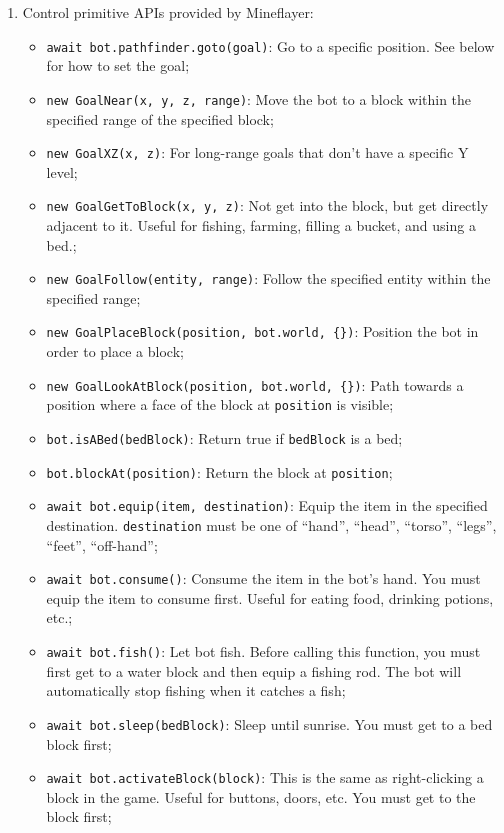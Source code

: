 \begin{enumerate}[label=(\arabic*)]
\begin{itemize}
    \end{itemize}
    \item Control primitive APIs provided by Mineflayer:
    \begin{itemize}
        \item \texttt{await bot.pathfinder.goto(goal)}: Go to a specific position. See below for how to set the goal;
        \item \texttt{new GoalNear(x, y, z, range)}: Move the bot to a block within the specified range of the specified block;
        \item \texttt{new GoalXZ(x, z)}: For long-range goals that don't have a specific Y level;
        \item \texttt{new GoalGetToBlock(x, y, z)}: Not get into the block, but get directly adjacent to it. Useful for fishing, farming, filling a bucket, and using a bed.;
        \item \texttt{new GoalFollow(entity, range)}: Follow the specified entity within the specified range;
        \item \texttt{new GoalPlaceBlock(position, bot.world, \{\})}: Position the bot in order to place a block;
        \item \texttt{new GoalLookAtBlock(position, bot.world, \{\})}: Path towards a position where a face of the block at \texttt{position} is visible;
        \item \texttt{bot.isABed(bedBlock)}: Return true if \texttt{bedBlock} is a bed;
        \item \texttt{bot.blockAt(position)}: Return the block at \texttt{position};
        \item \texttt{await bot.equip(item, destination)}: Equip the item in the specified destination. \texttt{destination} must be one of ``hand'', ``head'', ``torso'', ``legs'', ``feet'', ``off-hand'';
        \item \texttt{await bot.consume()}: Consume the item in the bot's hand. You must equip the item to consume first. Useful for eating food, drinking potions, etc.;
        \item \texttt{await bot.fish()}: Let bot fish. Before calling this function, you must first get to a water block and then equip a fishing rod. The bot will automatically stop fishing when it catches a fish;
        \item \texttt{await bot.sleep(bedBlock)}: Sleep until sunrise. You must get to a bed block first;
        \item \texttt{await bot.activateBlock(block)}: This is the same as right-clicking a block in the game. Useful for buttons, doors, etc. You must get to the block first;

\end{itemize}
\end{enumerate}
